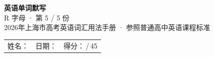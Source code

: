 \documentclass[10pt,a4paper]{article}
\begin{document}
\pagestyle{plain}

\begin{center}
{\LARGE\bfseries 英语单词默写}\\[0.22em]
{\large R 字母 · 第 5 / 5 份}\\[0.18em]
{\small 2026年上海市高考英语词汇用法手册 · 参照普通高中英语课程标准}
\end{center}

\vspace{0.25em}
\noindent\begin{tabular}{@{}p{}@{}p{}@{}p{}@{}}
姓名：\underline{\hspace{2.0cm}} & 日期：\underline{\hspace{2.0cm}} & 得分：\underline{\hspace{1.3cm}}\,/\,45 \\
\end{tabular}

\vspace{0.3em}

\vspace{0.08em}
\end{document}
